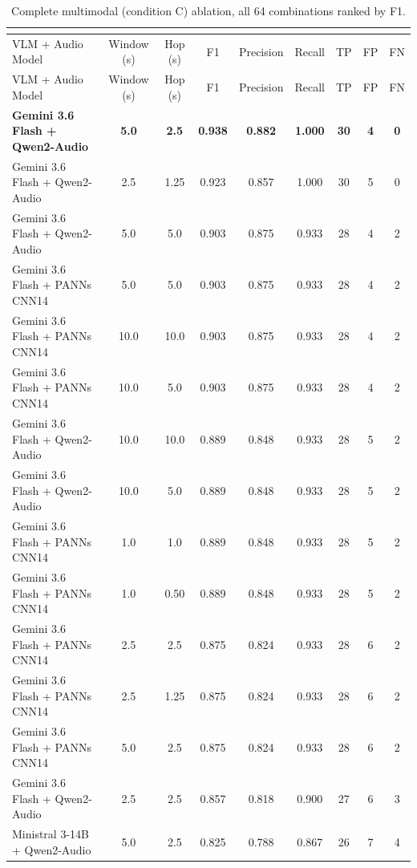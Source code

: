 {\footnotesize
\setlength{\tabcolsep}{2.0pt}
\begin{longtable}{lcccccccc}
\caption{Complete multimodal (condition C) ablation, all 64 combinations ranked by F1.}\\
\label{tab:full_ablation}\\
\toprule
VLM + Audio Model & Window (s) & Hop (s) & F1 & Precision & Recall & TP & FP & FN \\
\midrule
\endfirsthead
\toprule
VLM + Audio Model & Window (s) & Hop (s) & F1 & Precision & Recall & TP & FP & FN \\
\midrule
\endhead
\bottomrule
\endlastfoot
    \textbf{Gemini 3.6 Flash + Qwen2-Audio} & \textbf{5.0} & \textbf{2.5} & \textbf{0.938} & \textbf{0.882} & \textbf{1.000} & \textbf{30} & \textbf{4} & \textbf{0} \\
    Gemini 3.6 Flash + Qwen2-Audio & 2.5 & 1.25 & 0.923 & 0.857 & 1.000 & 30 & 5 & 0 \\
    Gemini 3.6 Flash + Qwen2-Audio & 5.0 & 5.0 & 0.903 & 0.875 & 0.933 & 28 & 4 & 2 \\
    Gemini 3.6 Flash + PANNs CNN14 & 5.0 & 5.0 & 0.903 & 0.875 & 0.933 & 28 & 4 & 2 \\
    Gemini 3.6 Flash + PANNs CNN14 & 10.0 & 10.0 & 0.903 & 0.875 & 0.933 & 28 & 4 & 2 \\
    Gemini 3.6 Flash + PANNs CNN14 & 10.0 & 5.0 & 0.903 & 0.875 & 0.933 & 28 & 4 & 2 \\
    Gemini 3.6 Flash + Qwen2-Audio & 10.0 & 10.0 & 0.889 & 0.848 & 0.933 & 28 & 5 & 2 \\
    Gemini 3.6 Flash + Qwen2-Audio & 10.0 & 5.0 & 0.889 & 0.848 & 0.933 & 28 & 5 & 2 \\
    Gemini 3.6 Flash + PANNs CNN14 & 1.0 & 1.0 & 0.889 & 0.848 & 0.933 & 28 & 5 & 2 \\
    Gemini 3.6 Flash + PANNs CNN14 & 1.0 & 0.50 & 0.889 & 0.848 & 0.933 & 28 & 5 & 2 \\
    Gemini 3.6 Flash + PANNs CNN14 & 2.5 & 2.5 & 0.875 & 0.824 & 0.933 & 28 & 6 & 2 \\
    Gemini 3.6 Flash + PANNs CNN14 & 2.5 & 1.25 & 0.875 & 0.824 & 0.933 & 28 & 6 & 2 \\
    Gemini 3.6 Flash + PANNs CNN14 & 5.0 & 2.5 & 0.875 & 0.824 & 0.933 & 28 & 6 & 2 \\
    Gemini 3.6 Flash + Qwen2-Audio & 2.5 & 2.5 & 0.857 & 0.818 & 0.900 & 27 & 6 & 3 \\
    Ministral 3-14B + Qwen2-Audio & 5.0 & 2.5 & 0.825 & 0.788 & 0.867 & 26 & 7 & 4 \\

\end{longtable}}
